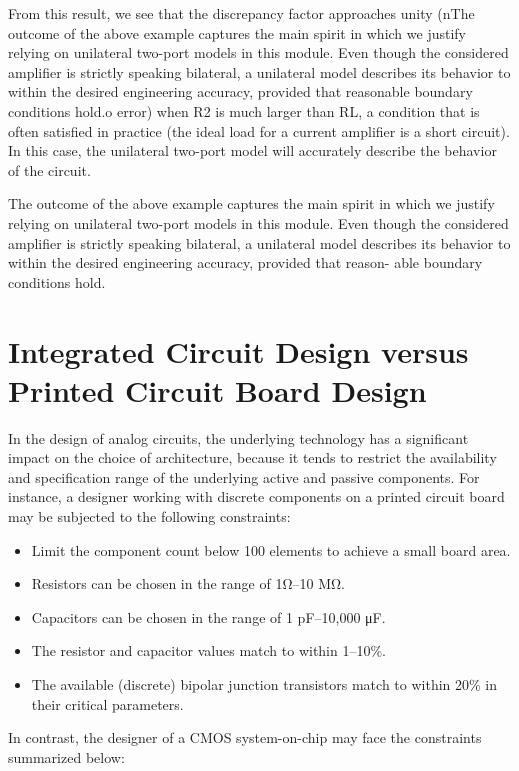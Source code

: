 \documentclass[
  11pt,
  letterpaper,
  abstract]{scrbook}
\begin{document}
From this result, we see that the discrepancy factor approaches unity
(nThe outcome of the above example captures the main spirit in which we
justify relying on unilateral two-port models in this module. Even
though the considered amplifier is strictly speaking bilateral, a
unilateral model describes its behavior to within the desired
engineering accuracy, provided that reasonable boundary conditions
hold.o error) when R2 is much larger than RL, a condition that is often
satisfied in practice (the ideal load for a current amplifier is a short
circuit). In this case, the unilateral two-port model will accurately
describe the behavior of the circuit.

The outcome of the above example captures the main spirit in which we
justify relying on unilateral two-port models in this module. Even
though the considered amplifier is strictly speaking bilateral, a
unilateral model describes its behavior to within the desired
engineering accuracy, provided that reason- able boundary conditions
hold.

\section{Integrated Circuit Design versus Printed Circuit Board
Design}\label{integrated-circuit-design-versus-printed-circuit-board-design}

In the design of analog circuits, the underlying technology has a
significant impact on the choice of architecture, because it tends to
restrict the availability and specification range of the underlying
active and passive components. For instance, a designer working with
discrete components on a printed circuit board may be subjected to the
following constraints:

\begin{itemize}
\item
  Limit the component count below 100 elements to achieve a small board
  area.
\item
  Resistors can be chosen in the range of 1Ω--10 MΩ.
\item
  Capacitors can be chosen in the range of 1 pF--10,000 μF.
\item
  The resistor and capacitor values match to within 1--10\%.
\item
  The available (discrete) bipolar junction transistors match to within
  20\% in their critical parameters.
\end{itemize}

In contrast, the designer of a CMOS system-on-chip may face the
constraints summarized below:
\end{document}
